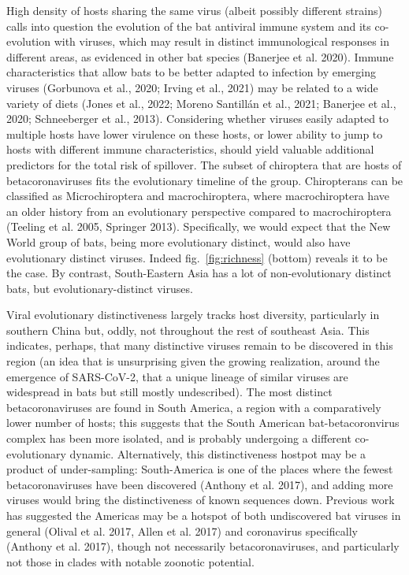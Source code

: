 \documentclass[10pt,oneside]{article}
\begin{document}
High density of hosts sharing the same virus (albeit possibly different
strains) calls into question the evolution of the bat antiviral immune
system and its co-evolution with viruses, which may result in distinct
immunological responses in different areas, as evidenced in other bat
species (Banerjee et al. 2020). Immune characteristics that allow bats
to be better adapted to infection by emerging viruses (Gorbunova et al.,
2020; Irving et al., 2021) may be related to a wide variety of diets
(Jones et al., 2022; Moreno Santillán et al., 2021; Banerjee et al.,
2020; Schneeberger et al., 2013). Considering whether viruses easily
adapted to multiple hosts have lower virulence on these hosts, or lower
ability to jump to hosts with different immune characteristics, should
yield valuable additional predictors for the total risk of spillover.
The subset of chiroptera that are hosts of betacoronaviruses fits the
evolutionary timeline of the group. Chiropterans can be classified as
Microchiroptera and macrochiroptera, where macrochiroptera have an older
history from an evolutionary perspective compared to macrochiroptera
(Teeling et al. 2005, Springer 2013). Specifically, we would expect that
the New World group of bats, being more evolutionary distinct, would
also have evolutionary distinct viruses. Indeed fig.~\ref{fig:richness}
(bottom) reveals it to be the case. By contrast, South-Eastern Asia has
a lot of non-evolutionary distinct bats, but evolutionary-distinct
viruses.

Viral evolutionary distinctiveness largely tracks host diversity,
particularly in southern China but, oddly, not throughout the rest of
southeast Asia. This indicates, perhaps, that many distinctive viruses
remain to be discovered in this region (an idea that is unsurprising
given the growing realization, around the emergence of SARS-CoV-2, that
a unique lineage of similar viruses are widespread in bats but still
mostly undescribed). The most distinct betacoronaviruses are found in
South America, a region with a comparatively lower number of hosts; this
suggests that the South American bat-betacoronvirus complex has been
more isolated, and is probably undergoing a different co-evolutionary
dynamic. Alternatively, this distinctiveness hostpot may be a product of
under-sampling: South-America is one of the places where the fewest
betacoronaviruses have been discovered (Anthony et al. 2017), and adding
more viruses would bring the distinctiveness of known sequences down.
Previous work has suggested the Americas may be a hotspot of both
undiscovered bat viruses in general (Olival et al. 2017, Allen et al.
2017) and coronavirus specifically (Anthony et al. 2017), though not
necessarily betacoronaviruses, and particularly not those in clades with
notable zoonotic potential.
\end{document}
